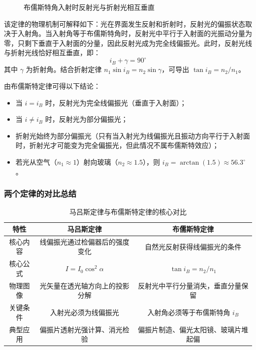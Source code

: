 \documentclass[UTF8]{ctexbook}
\begin{document}
\begin{figure}[htbp]
\centering
\caption{布儒斯特角入射时反射光与折射光相互垂直}
\label{fig:brewster_angle}
\end{figure}

该定律的物理机制可解释如下：光在界面发生反射和折射时，反射光的偏振状态取决于入射角。当入射角等于布儒斯特角时，反射光中平行于入射面的光振动分量为零，只剩下垂直于入射面的分量，因此反射光成为完全线偏振光。此时，反射光线与折射光线恰好相互垂直，即：
\[
i_B + \gamma = 90^\circ
\]
其中 \(\gamma\) 为折射角。结合折射定律 \(n_1\sin i_B = n_2\sin\gamma\)，可导出 \(\tan i_B = n_2/n_1\)。

由布儒斯特定律可得以下结论：
\begin{itemize}
    \item 当 \(i = i_B\) 时，反射光为完全线偏振光（垂直于入射面）；
    \item 当 \(i \neq i_B\) 时，反射光为部分偏振光；
    \item 折射光始终为部分偏振光（只有当入射光为线偏振光且振动方向平行于入射面时，折射光才可能变为完全偏振光，但此情况不属布儒斯特效应）；
    \item 若光从空气（\(n_1 \approx 1\)）射向玻璃（\(n_2 \approx 1.5\)），则 \(i_B = \arctan(1.5) \approx 56.3^\circ\)。
\end{itemize}

\subsubsection{两个定律的对比总结}

\begin{table}[htbp]
\centering
\caption{马吕斯定律与布儒斯特定律的核心对比}
\label{tab:polarization_laws}
\begin{tabular}{|c|c|c|}
\hline
\textbf{特性} & \textbf{马吕斯定律} & \textbf{布儒斯特定律} \\
\hline
核心内容 & 线偏振光通过检偏器后的强度变化 & 自然光反射获得线偏振光的条件 \\
\hline
核心公式 & \(I = I_0\cos^2\alpha\) & \(\tan i_B = n_2/n_1\) \\
\hline
物理图像 & 光矢量在透光轴方向上的投影分解 & 反射光中平行分量消失，垂直分量保留 \\
\hline
关键条件 & 入射光必须为线偏振光 & 入射角必须等于布儒斯特角 \(i_B\) \\
\hline
典型应用 & 偏振片透射光强计算、消光检验 & 偏振片制造、偏光太阳镜、玻璃片堆起偏 \\
\hline
\end{tabular}
\end{table}
\end{document}
